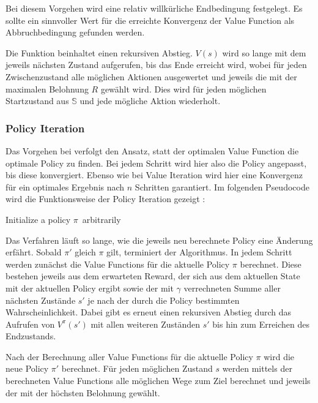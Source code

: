 Bei diesem Vorgehen wird eine relativ willkürliche Endbedingung festgelegt. Es sollte ein sinnvoller Wert für die erreichte Konvergenz der Value Function als Abbruchbedingung gefunden werden.

Die Funktion beinhaltet einen rekursiven Abstieg. $V(s)$ wird so lange mit dem jeweils nächsten Zustand aufgerufen, bis das Ende erreicht wird, wobei für jeden Zwischenzustand alle möglichen Aktionen ausgewertet und jeweils die mit der maximalen Belohnung $R$ gewählt wird.
Dies wird für jeden möglichen Startzustand aus $\mathbb{S}$ und jede mögliche Aktion wiederholt.


\subsubsection{Policy Iteration}
Das Vorgehen bei  verfolgt den Ansatz, statt der optimalen Value Function die optimale Policy zu finden. Bei jedem Schritt wird hier also die Policy angepasst, bis diese konvergiert. Ebenso wie bei Value Iteration wird hier eine Konvergenz für ein optimales Ergebnis nach $n$ Schritten garantiert.
Im folgenden Pseudocode wird die Funktionsweise der Policy Iteration gezeigt \cite{intro_to_ml_book}:

\smallskip
\begin{algorithm}[H]
\SetAlgoLined
{}
\smallskip
Initialize a policy $\pi$\ arbitrarily\;
\caption{Policy Iteration}
\end{algorithm}
\smallskip
\smallskip

Das Verfahren läuft so lange, wie die jeweils neu berechnete Policy eine Änderung erfährt. Sobald ${\pi}'$ gleich $\pi$ gilt, terminiert der Algorithmus.
In jedem Schritt werden zunächst die Value Functions für die aktuelle Policy $\pi$ berechnet. Diese bestehen jeweils aus dem erwarteten Reward, der sich aus dem aktuellen State mit der aktuellen Policy ergibt sowie der mit $\gamma$ verrechneten Summe aller nächsten Zustände $s'$ je nach der durch die Policy bestimmten Wahrscheinlichkeit. Dabei gibt es erneut einen rekursiven Abstieg durch das Aufrufen von $V^{\pi}(s')$ mit allen weiteren Zuständen $s'$ bis hin zum Erreichen des Endzustands.

Nach der Berechnung aller Value Functions für die aktuelle Policy $\pi$ wird die neue Policy ${\pi}'$ berechnet. Für jeden möglichen Zustand $s$ werden mittels der berechneten Value Functions alle möglichen Wege zum Ziel berechnet und jeweils der mit der höchsten Belohnung gewählt.

